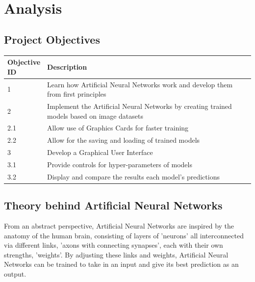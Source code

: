 \documentclass[./project-report/src/latex/project-report.tex]{subfiles}
\begin{document}
\maketitle

\clearpage
\section{Analysis}

\subsection{Project Objectives}

\begin{tabular}{|p{0.13\linewidth}|p{0.87\linewidth}|}
      \hline
      \textbf{Objective ID} & \textbf{Description} \\
      \hline
      1 & Learn how Artificial Neural Networks work and develop them from first principles \\
      \hline
      2 & Implement the Artificial Neural Networks by creating trained models based on image datasets \\
      \hline
      2.1 & Allow use of Graphics Cards for faster training \\
      \hline
      2.2 & Allow for the saving and loading of trained models \\
      \hline
      3 & Develop a Graphical User Interface \\
      \hline
      3.1 & Provide controls for hyper-parameters of models \\
      \hline
      3.2 & Display and compare the results each model's predictions \\
      \hline
\end{tabular}

\subsection{Theory behind Artificial Neural Networks}
\label{sec:ann-theory}

From an abstract perspective, Artificial Neural Networks are inspired by the anatomy of the human brain, consisting of layers of 'neurons' all interconnected via 
different links, 'axons with connecting synapses', each with their own strengths, 'weights'. By adjusting these links and weights, Artificial Neural Networks can be trained 
to take in an input and give its best prediction as an output.
\end{document}
